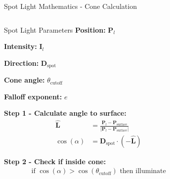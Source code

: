 \begin{frame}{Spot Light Mathematics - Cone Calculation}
  \begin{columns}
    \begin{column}{0.7\textwidth}
      \begin{mathbox}{Spot Light Parameters}
        \textbf{Position:} $\mathbf{P}_l$

        \textbf{Intensity:} $\mathbf{I}_l$

        \textbf{Direction:} $\mathbf{D}_{\text{spot}}$

        \textbf{Cone angle:} $\theta_{\text{cutoff}}$

        \textbf{Falloff exponent:} $e$

        \vspace{0.3cm}
        \pause
        \textbf{Step 1 - Calculate angle to surface:}
        \begin{align*}
          \hat{\mathbf{L}} &= \frac{\mathbf{P}_l - \mathbf{P}_{\text{surface}}}
          {|\mathbf{P}_l - \mathbf{P}_{\text{surface}}|} \\
          \cos(\alpha) &=  \mathbf{D}_{\text{spot}} \cdot (- \hat{\mathbf{L}})
        \end{align*}

        \pause
        \textbf{Step 2 - Check if inside cone:}
        \begin{align*}
          \text{if } \cos(\alpha) > \cos(\theta_{\text{cutoff}}) \text{ then illuminate}
        \end{align*}
      \end{mathbox}
    \end{column}
    \begin{column}{0.3\textwidth}
\end{column}
\end{columns}
\end{frame}
